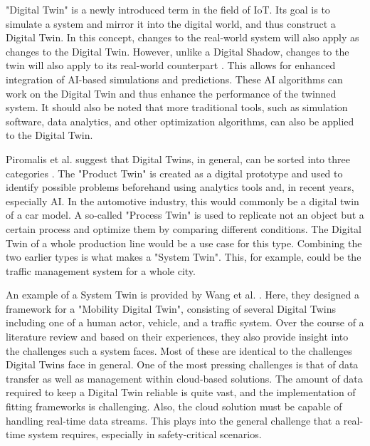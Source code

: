 \label{se:DigitalTwin}

"Digital Twin" is a newly introduced term in the field of IoT. Its goal is to simulate a system and mirror it into the digital world, and thus construct a Digital Twin. In this concept, changes to the real-world system will also apply as changes to the Digital Twin. However, unlike a Digital Shadow, changes to the twin will also apply to its real-world counterpart \cite{bazmohammadi2022microgrid}. This allows for enhanced integration of AI-based simulations and predictions. These AI algorithms can work on the Digital Twin and thus enhance the performance of the twinned system. It should also be noted that more traditional tools, such as simulation software, data analytics, and other optimization algorithms, can also be applied to the Digital Twin.

Piromalis et al. suggest that Digital Twins, in general, can be sorted into three categories \cite{piromalis2022digital}. The "Product Twin" is created as a digital prototype and used to identify possible problems beforehand using analytics tools and, in recent years, especially AI. In the automotive industry, this would commonly be a digital twin of a car model. A so-called "Process Twin" is used to replicate not an object but a certain process and optimize them by comparing different conditions. The Digital Twin of a whole production line would be a use case for this type. Combining the two earlier types is what makes a "System Twin". This, for example, could be the traffic management system for a whole city.

An example of a System Twin is provided by Wang et al. \cite{wang_2021}. Here, they designed a framework for a "Mobility Digital Twin", consisting of several Digital Twins including one of a human actor, vehicle, and a traffic system. Over the course of a literature review and based on their experiences, they also provide insight into the challenges such a system faces. Most of these are identical to the challenges Digital Twins face in general. One of the most pressing challenges is that of data transfer as well as management within cloud-based solutions. The amount of data required to keep a Digital Twin reliable is quite vast, and the implementation of fitting frameworks is challenging. Also, the cloud solution must be capable of handling real-time data streams. This plays into the general challenge that a real-time system requires, especially in safety-critical scenarios.

